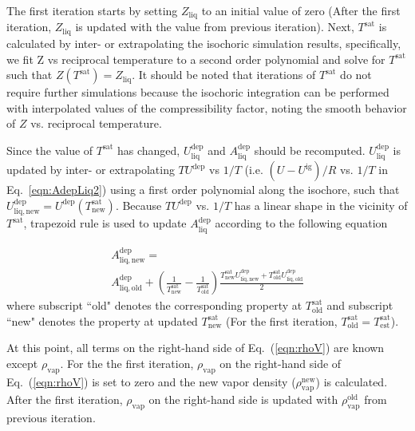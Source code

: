 \documentclass[5p,times]{elsarticle}
\begin{document}
The first iteration starts by setting $Z_\mathrm{liq}$ to an initial value of zero (After the first iteration, $Z_\mathrm{liq}$ is updated with the value from previous iteration). Next, $T^\mathrm{sat}$ is calculated by inter- or extrapolating the isochoric simulation results, specifically, we fit Z vs reciprocal temperature to a second order polynomial and solve for $T^\mathrm{sat}$ such that $Z(T^\mathrm{sat})=Z_\mathrm{liq}$. It should be noted that iterations of $T^\mathrm{sat}$ do not require further simulations because the isochoric integration can be performed with interpolated values of the compressibility factor, noting the smooth behavior of $Z$ vs. reciprocal temperature.

Since the value of $T^\mathrm{sat}$ has changed, $U^\mathrm{dep}_\mathrm{liq}$ and $A^\mathrm{dep}_\mathrm{liq}$ should be recomputed. $U^\mathrm{dep}_\mathrm{liq}$ is updated by inter- or extrapolating $TU^\mathrm{dep}$ vs $1/T$ (i.e. $(U-U^\mathrm{ig})/R$ vs. $1/T$ in Eq.~\ref{eqn:AdepLiq2}) using a first order polynomial along the isochore, such that $U^\mathrm{dep}_\mathrm{liq,new} = U^\mathrm{dep}(T^\mathrm{sat}_\mathrm{new})$. Because $TU^\mathrm{dep}$ vs. $1/T$ has a linear shape in the vicinity of $T^\mathrm{sat}$, trapezoid rule is used to update $A^\mathrm{dep}_\mathrm{liq}$ according to the following equation

\begin{equation}
\begin{array}{l}
A^\mathrm{dep}_\mathrm{liq,new} = 
\\
A^\mathrm{dep}_\mathrm{liq,old} + \left( \frac{1}{T^\mathrm{sat}_\mathrm{new}}-\frac{1}{T^\mathrm{sat}_\mathrm{old}} \right) \frac{T^\mathrm{sat}_\mathrm{new}U^\mathrm{dep}_\mathrm{liq,new}+T^\mathrm{sat}_\mathrm{old}U^\mathrm{dep}_\mathrm{liq,old}}{2} 
\end{array}
\label{eqn:aDepCorrection}
\end{equation}
where subscript ``old" denotes the corresponding property at $T^\mathrm{sat}_\mathrm{old}$ and subscript ``new" denotes the property at updated $T^\mathrm{sat}_\mathrm{new}$ (For the first iteration, $T^\mathrm{sat}_\mathrm{old} = T^\mathrm{sat}_\mathrm{est}$). 

At this point, all terms on the right-hand side of Eq.~(\ref{eqn:rhoV}) are known except $\rho_\mathrm{vap}$. For the the first iteration, $\rho_\mathrm{vap}$ on the right-hand side of Eq.~(\ref{eqn:rhoV}) is set to zero and the new vapor density ($\rho_\mathrm{vap}^\mathrm{new}$) is calculated. After the first iteration, $\rho_\mathrm{vap}$ on the right-hand side is updated with $\rho_\mathrm{vap}^\mathrm{old}$ from previous iteration. 
\end{document}

